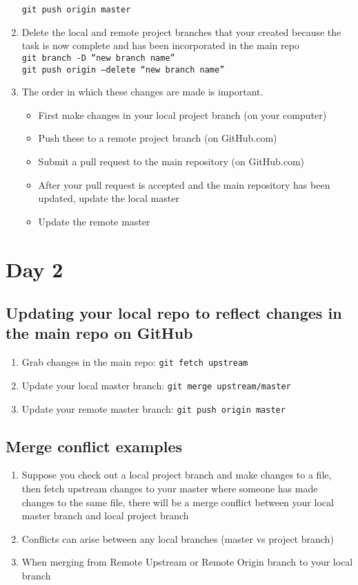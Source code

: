 \documentclass{article}
\begin{document}
\begin{enumerate}
	\texttt{git push origin master}
	\item Delete the local and remote project branches that your created because the task is now complete and has been incorporated in the main repo \\
	\texttt{git branch -D ``new branch name''} \\
	\texttt{git push origin —delete ``new branch name''}
	\item The order in which these changes are made is important.
	\begin{itemize}
		\item First make changes in your local project branch (on your computer)
		\item Push these to a remote project branch (on GitHub.com)
		\item Submit a pull request to the main repository (on GitHub.com)
		\item After your pull request is accepted and the main repository has been updated, update the local master
		\item Update the remote master
	\end{itemize}
\end{enumerate}
\clearpage 
\section{Day 2}
\subsection{Updating your local repo to reflect changes in the main repo on GitHub}
\begin{enumerate}
	\item Grab changes in the main repo: \texttt{git fetch upstream}
	\item Update your local master branch: \texttt{git merge upstream/master}
	\item Update your remote master branch: \texttt{git push origin master}
\end{enumerate}

\subsection{Merge conflict examples}
\begin{enumerate}
	\item Suppose you check out a local project branch and make changes to a file, then fetch upstream changes to your master where someone has made changes to the same file, there will be a merge conflict between your local master branch and local project branch
	\item Conflicts can arise between any local branches (master vs project branch)
	\item When merging from Remote Upstream or Remote Origin branch to your local branch
\end{enumerate}
\end{document}
